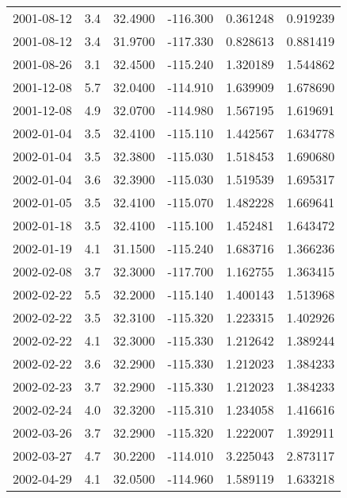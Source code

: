 \begin{tabular}{lrrrrr}
2001-08-12 &       3.4 &  32.4900 &  -116.300 &         0.361248 &         0.919239 \\
2001-08-12 &       3.4 &  31.9700 &  -117.330 &         0.828613 &         0.881419 \\
2001-08-26 &       3.1 &  32.4500 &  -115.240 &         1.320189 &         1.544862 \\
2001-12-08 &       5.7 &  32.0400 &  -114.910 &         1.639909 &         1.678690 \\
2001-12-08 &       4.9 &  32.0700 &  -114.980 &         1.567195 &         1.619691 \\
2002-01-04 &       3.5 &  32.4100 &  -115.110 &         1.442567 &         1.634778 \\
2002-01-04 &       3.5 &  32.3800 &  -115.030 &         1.518453 &         1.690680 \\
2002-01-04 &       3.6 &  32.3900 &  -115.030 &         1.519539 &         1.695317 \\
2002-01-05 &       3.5 &  32.4100 &  -115.070 &         1.482228 &         1.669641 \\
2002-01-18 &       3.5 &  32.4100 &  -115.100 &         1.452481 &         1.643472 \\
2002-01-19 &       4.1 &  31.1500 &  -115.240 &         1.683716 &         1.366236 \\
2002-02-08 &       3.7 &  32.3000 &  -117.700 &         1.162755 &         1.363415 \\
2002-02-22 &       5.5 &  32.2000 &  -115.140 &         1.400143 &         1.513968 \\
2002-02-22 &       3.5 &  32.3100 &  -115.320 &         1.223315 &         1.402926 \\
2002-02-22 &       4.1 &  32.3000 &  -115.330 &         1.212642 &         1.389244 \\
2002-02-22 &       3.6 &  32.2900 &  -115.330 &         1.212023 &         1.384233 \\
2002-02-23 &       3.7 &  32.2900 &  -115.330 &         1.212023 &         1.384233 \\
2002-02-24 &       4.0 &  32.3200 &  -115.310 &         1.234058 &         1.416616 \\
2002-03-26 &       3.7 &  32.2900 &  -115.320 &         1.222007 &         1.392911 \\
2002-03-27 &       4.7 &  30.2200 &  -114.010 &         3.225043 &         2.873117 \\
2002-04-29 &       4.1 &  32.0500 &  -114.960 &         1.589119 &         1.633218 \\

\end{tabular}

